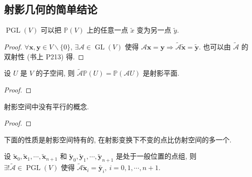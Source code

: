 \documentclass{ctexart}
\begin{document}
\subsection{射影几何的简单结论}
\begin{theorem}
    $\operatorname{PGL}(V)$ 可以把 $\mathbb{P}(V)$ 上的任意一点 $\tilde{x}$ 变为另一点 $\tilde{y}$.
\end{theorem}
\begin{proof}
    $\forall\boldsymbol{x},\boldsymbol{y}\in V\backslash\{0\}$, $\exists\mathcal{A}\in\operatorname{GL}(V)$ 使得 $\mathcal{A}\boldsymbol{x}=\boldsymbol{y}\Rightarrow\widetilde{\mathcal{A}}\tilde{\boldsymbol{x}}=\tilde{\boldsymbol{y}}$. 也可以由 $\widetilde{\mathcal{A}}$ 的双射性 (书上 P213) 得.
\end{proof}
\begin{theorem}
    设 $U$ 是 $V$ 的子空间, 则 $\widetilde{\mathcal{A}}\mathbb{P}(U)=\mathbb{P}(\mathcal{A}U)$ 是射影平面.
\end{theorem}
\begin{proof}
    
\end{proof}
\begin{theorem}
    射影空间中没有平行的概念.
\end{theorem}
\begin{proof}
    
\end{proof}
下面的性质是射影空间特有的, 在射影变换下不变的点比仿射空间的多一个.
\begin{theorem}[书上的定理 3]\label{t3.10}
    设 $\tilde{\boldsymbol{x}}_0,\tilde{\boldsymbol{x}}_1,\cdots,\tilde{\boldsymbol{x}}_{n+1}$ 和 $\tilde{\boldsymbol{y}}_0,\tilde{\boldsymbol{y}}_1,\cdots,\tilde{\boldsymbol{y}}_{n+1}$ 是处于一般位置的点组, 则 $\exists!\widetilde{\mathcal{A}}\in\operatorname{PGL}(V)$ 使得 $\widetilde{\mathcal{A}}\tilde{\boldsymbol{x}}_i=\tilde{\boldsymbol{y}_i},\ i=0,1,\cdots,n+1$.
\end{theorem}
\end{document}
